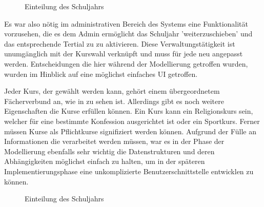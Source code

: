 \documentclass[12pt, twoside, a4paper, ngerman]{article}
\begin{document}
\begin{figure}[h]
\begin{center}


\end{center}
\caption[\textbf{Einteilung des Schuljahrs}]{Einteilung des Schuljahrs}
\label{fig:Schuljahreinteilung}
\end{figure}

Es war also nötig im administrativen Bereich des Systems eine Funktionalität vorzusehen, die es dem Admin ermöglicht das Schuljahr 'weiterzuschieben' und das entsprechende Tertial zu zu aktivieren.
Diese Verwaltungstätigkeit ist unumgänglich mit der Kurswahl verknüpft und muss für jede neu angepasst werden. 
Entscheidungen die hier während der Modellierung getroffen wurden, wurden im Hinblick auf eine möglichst einfaches \ac{UI} getroffen.

Jeder Kurs, der gewählt werden kann, gehört einem übergeordnetem Fächerverbund an, wie in  zu sehen ist.
Allerdings gibt es noch weitere Eigenschaften die Kurse erfüllen können. Ein Kurs kann ein Religionskurs sein, welcher für eine bestimmte Konfession ausgerichtet ist oder ein Sportkurs.
Ferner müssen Kurse als Pflichtkurse signifiziert werden können.
Aufgrund der Fülle an Informationen die verarbeitet werden müssen, war es in der Phase der Modellierung ebenfalls sehr wichtig die Datenstrukturen und deren Abhängigkeiten möglichst einfach zu halten, um in der späteren Implementierungsphase eine unkomplizierte Benutzerschnittstelle entwicklen zu können. 

\begin{figure}[h]
\begin{center}


\end{center}
\caption[\textbf{Einteilung des Schuljahrs}]{Einteilung des Schuljahrs}
\label{fig:KursFaecherverbund}
\end{figure}
\end{document}
